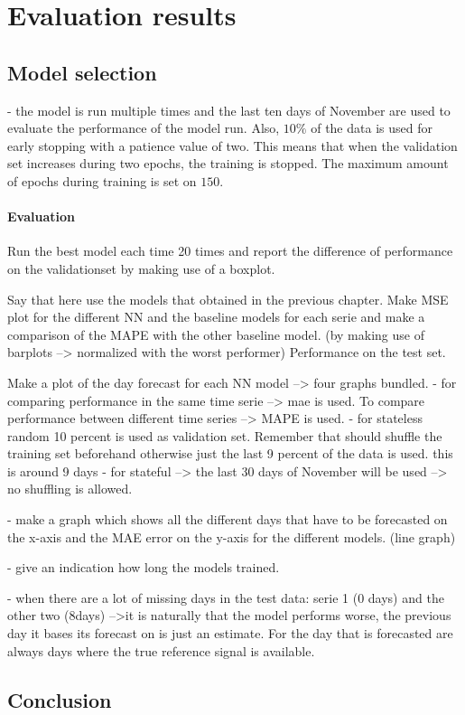 \chapter{Evaluation results}
\label{cha:Evaluating results}


\section{Model selection}
- the model is run multiple times and the last ten days of November are used to evaluate the performance of the model run. Also, $ 10 \% $ of the data is used for early stopping with a patience value of two. This means that when the validation set increases during two epochs, the training is stopped. The maximum amount of epochs during training is set on $ 150 $.


\subsubsection{Evaluation}




Run the best model each time 20 times and report the difference of  performance on the validationset by making use of a boxplot. 


Say that here use the models that obtained in the previous chapter. Make MSE plot for the different NN and the baseline models for each serie and make a comparison of the MAPE with the other baseline model. (by making use of barplots --> normalized with the worst performer) Performance on the test set. 

Make a plot of the day forecast for each NN model --> four graphs bundled. 
- for comparing performance in the same time serie --> mae is used. To compare performance between different time series --> MAPE is used. 
- for stateless random 10 percent is used as validation set. Remember that should shuffle the training set beforehand otherwise just the last 9 percent of the data is used. this is around 9 days
- for stateful --> the last 30 days of November will be used --> no shuffling is allowed.

- make a graph which shows all the different days that have to be forecasted on the x-axis and the MAE error on the y-axis for the different models. (line graph)

- give an indication how long the models trained.

- when there are a lot of missing days in the test data: serie 1 (0 days) and the other two (8days) -->it is naturally that the model performs worse, the previous day it bases its forecast on is just an estimate. For the day that is forecasted are always days where the true reference signal is available. 


\section{Conclusion}
\lipsum[86-88]

